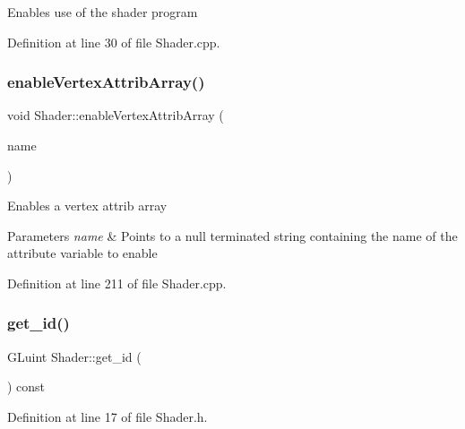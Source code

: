 Enables use of the shader program 

Definition at line 30 of file Shader.\+cpp.

\mbox{\label{class_shader_aee904a5bc799d32e28a9007f82f7c8f3}} 
\subsubsection{\texorpdfstring{enable\+Vertex\+Attrib\+Array()}{enableVertexAttribArray()}}
{\footnotesize\ttfamily void Shader\+::enable\+Vertex\+Attrib\+Array (\begin{DoxyParamCaption}\item[{const G\+Lchar $\ast$}]{name }\end{DoxyParamCaption})}

Enables a vertex attrib array 
\begin{DoxyParams}{Parameters}
{\em name} & Points to a null terminated string containing the name of the attribute variable to enable \\
\hline
\end{DoxyParams}


Definition at line 211 of file Shader.\+cpp.

\mbox{\label{class_shader_a3e18d47a57e86322c1e76bf78f13ca17}} 
\subsubsection{\texorpdfstring{get\+\_\+id()}{get\_id()}}
{\footnotesize\ttfamily G\+Luint Shader\+::get\+\_\+id (\begin{DoxyParamCaption}{ }\end{DoxyParamCaption}) const\hspace{0.3cm}{\ttfamily [inline]}}



Definition at line 17 of file Shader.\+h.

\mbox{\label{class_shader_a6dda73168720b8d4871f9a2340c914d0}} 
